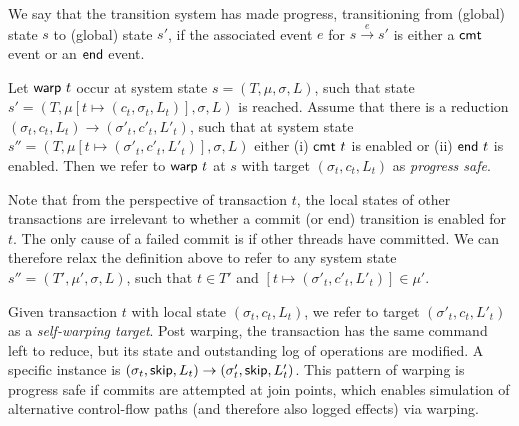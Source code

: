 \begin{definition}[Progress]
	We say that the transition system has made progress, transitioning from (global) state $s$ to (global) state $s'$, if the associated event $e$ for
	$s \stackrel{e}{\longrightarrow} s'$ is either a ${\sf cmt}$ event or an ${\sf end}$ event.
\end{definition}

\begin{definition}
	Let ${\sf warp}\ t$ occur at system state $s=(T,\mu,\sigma,L)$, such that state $s'=(T,\mu[t \mapsto (c_t,\sigma_t,L_t)],\sigma,L)$ is reached. Assume that there is a reduction
	$(\sigma_t,c_t,L_t) {\longrightarrow} (\sigma'_t,c'_t,L'_t)$, such that 
	at system state $s''=(T,\mu[t \mapsto (\sigma'_t,c'_t,L'_t)],\sigma,L)$ either (i)  ${\sf cmt}\ t$ is enabled or (ii) ${\sf end}\ t$ is enabled. Then we refer to ${\sf warp}\ t$ at $s$ with target $(\sigma_t,c_t,L_t)$ as \emph{progress safe}.
\end{definition}

Note that from the perspective of transaction $t$, the local states of other transactions are irrelevant to whether a commit (or end) transition is enabled for $t$. The only cause of a failed commit is if other threads have committed. We can therefore relax the definition above to refer to any system state $s''=(T',\mu',\sigma,L)$, such that $t \in T'$ and 
$[t \mapsto  (\sigma'_t,c'_t,L'_t)] \in \mu'$.

\begin{example}\label{Ex:selfwarp}
	Given transaction $t$ with local state $(\sigma_t,c_t,L_t)$, we refer to target
	$(\sigma'_t,c_t,L'_t)$ as a \emph{self-warping target}. Post warping, the transaction has the same command left to reduce, but its state and outstanding log of operations are modified. A specific instance is $(\sigma_t,{\sf skip},L_t) \rightarrow (\sigma'_t,{\sf skip},L'_t)$. This pattern of warping is progress safe if commits are attempted at join points, which enables simulation of alternative control-flow paths (and therefore also logged effects) via warping.
\end{example}

